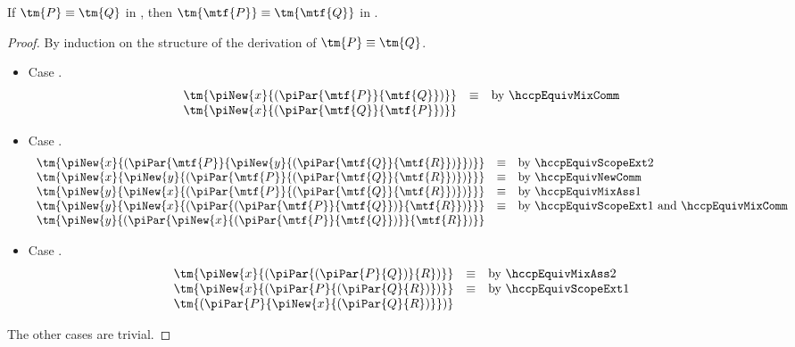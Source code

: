 \begin{theorem}\label{thm:hcp2hccp-equiv}
  If $\tm{P}\equiv\tm{Q}$ in \hcp, then $\tm{\mtf{P}}\equiv\tm{\mtf{Q}}$ in \hccp.
\end{theorem}
\begin{proof}
  By induction on the structure of the derivation of $\tm{P}\equiv\tm{Q}$.
  \begin{itemize}
  \item
    Case \hcpEquivCutComm.
    \begin{gather*}
      \begin{array}{lcl}
        \tm{\piNew{x}{(\piPar{\mtf{P}}{\mtf{Q}})}}
        & \equiv & \text{by \hccpEquivMixComm}
        \\
        \tm{\piNew{x}{(\piPar{\mtf{Q}}{\mtf{P}})}}
      \end{array}
    \end{gather*}
  \item
    Case .
    \begin{gather*}
      \begin{array}{lcl}
        \tm{\piNew{x}{(\piPar{\mtf{P}}{\piNew{y}{(\piPar{\mtf{Q}}{\mtf{R}})}})}}
        & \equiv & \text{by \hccpEquivScopeExt2}
        \\
        \tm{\piNew{x}{\piNew{y}{(\piPar{\mtf{P}}{(\piPar{\mtf{Q}}{\mtf{R}})})}}}
        & \equiv & \text{by \hccpEquivNewComm}
        \\
        \tm{\piNew{y}{\piNew{x}{(\piPar{\mtf{P}}{(\piPar{\mtf{Q}}{\mtf{R}})})}}}
        & \equiv & \text{by \hccpEquivMixAss1}
        \\
        \tm{\piNew{y}{\piNew{x}{(\piPar{(\piPar{\mtf{P}}{\mtf{Q}})}{\mtf{R}})}}}
        & \equiv & \text{by \hccpEquivScopeExt1 and \hccpEquivMixComm}
        \\
        \tm{\piNew{y}{(\piPar{\piNew{x}{(\piPar{\mtf{P}}{\mtf{Q}})}}{\mtf{R}})}}
      \end{array}
    \end{gather*}
  \item
    Case .
    \begin{gather*}
      \begin{array}{lcl}
        \tm{\piNew{x}{(\piPar{(\piPar{P}{Q})}{R})}}
        & \equiv & \text{by \hccpEquivMixAss2}
        \\
        \tm{\piNew{x}{(\piPar{P}{(\piPar{Q}{R})})}}
        & \equiv & \text{by \hccpEquivScopeExt1}
        \\
        \tm{(\piPar{P}{\piNew{x}{(\piPar{Q}{R})}})}
      \end{array}
    \end{gather*}
  \end{itemize}
  The other cases are trivial.
\end{proof}

